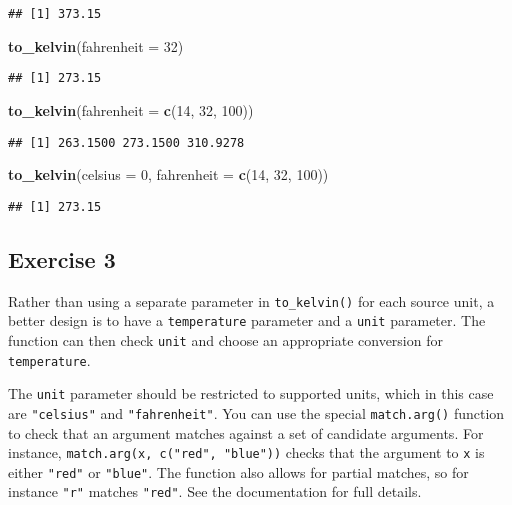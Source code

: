 \documentclass[
]{article}
\newenvironment{Shaded}{\begin{snugshade}}{\end{snugshade}}
\newcommand{\DataTypeTok}[1]{\textcolor[rgb]{0.13,0.29,0.53}{#1}}
\newcommand{\DecValTok}[1]{\textcolor[rgb]{0.00,0.00,0.81}{#1}}
\newcommand{\KeywordTok}[1]{\textcolor[rgb]{0.13,0.29,0.53}{\textbf{#1}}}
\newcommand{\NormalTok}[1]{#1}
\begin{document}
\begin{verbatim}
## [1] 373.15
\end{verbatim}

\begin{Shaded}
\begin{Highlighting}[]
\KeywordTok{to\_kelvin}\NormalTok{(}\DataTypeTok{fahrenheit =} \DecValTok{32}\NormalTok{)}
\end{Highlighting}
\end{Shaded}

\begin{verbatim}
## [1] 273.15
\end{verbatim}

\begin{Shaded}
\begin{Highlighting}[]
\KeywordTok{to\_kelvin}\NormalTok{(}\DataTypeTok{fahrenheit =} \KeywordTok{c}\NormalTok{(}\DecValTok{14}\NormalTok{, }\DecValTok{32}\NormalTok{, }\DecValTok{100}\NormalTok{))}
\end{Highlighting}
\end{Shaded}

\begin{verbatim}
## [1] 263.1500 273.1500 310.9278
\end{verbatim}

\begin{Shaded}
\begin{Highlighting}[]
\KeywordTok{to\_kelvin}\NormalTok{(}\DataTypeTok{celsius =} \DecValTok{0}\NormalTok{, }\DataTypeTok{fahrenheit =} \KeywordTok{c}\NormalTok{(}\DecValTok{14}\NormalTok{, }\DecValTok{32}\NormalTok{, }\DecValTok{100}\NormalTok{))}
\end{Highlighting}
\end{Shaded}

\begin{verbatim}
## [1] 273.15
\end{verbatim}

\hypertarget{exercise-3}{%
\subsection{Exercise 3}\label{exercise-3}}

Rather than using a separate parameter in \texttt{to\_kelvin()} for each
source unit, a better design is to have a \texttt{temperature} parameter
and a \texttt{unit} parameter. The function can then check \texttt{unit}
and choose an appropriate conversion for \texttt{temperature}.

The \texttt{unit} parameter should be restricted to supported units,
which in this case are \texttt{"celsius"} and \texttt{"fahrenheit"}. You
can use the special \texttt{match.arg()} function to check that an
argument matches against a set of candidate arguments. For instance,
\texttt{match.arg(x,\ c("red",\ "blue"))} checks that the argument to
\texttt{x} is either \texttt{"red"} or \texttt{"blue"}. The function
also allows for partial matches, so for instance \texttt{"r"} matches
\texttt{"red"}. See the documentation for full details.
\end{document}
